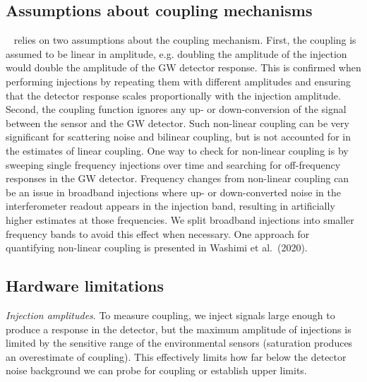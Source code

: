 \subsection{Assumptions about coupling mechanisms}

~ relies on two assumptions about the coupling mechanism.
First, the coupling is assumed to be linear in amplitude, e.g. doubling the amplitude of the injection would double the amplitude of the \ac{GW} detector response.
This is confirmed when performing injections by repeating them with different amplitudes and ensuring that the detector response scales proportionally with the injection amplitude.
Second, the coupling function ignores any up- or down-conversion of the signal between the sensor and the \ac{GW} detector.
Such non-linear coupling can be very significant for scattering noise and bilinear coupling, but is not accounted for in the estimates of linear coupling.
One way to check for non-linear coupling is by sweeping single frequency injections over time and searching for off-frequency responses in the \ac{GW} detector.
Frequency changes from non-linear coupling can be an issue in broadband injections where up- or down-converted noise in the interferometer readout appears in the injection band, resulting in artificially higher estimates at those frequencies.
We split broadband injections into smaller frequency bands to avoid this effect when necessary.
One approach for quantifying non-linear coupling is presented in Washimi et al.\ (2020).%

\subsection{Hardware limitations}\label{subsec:hardware_limitations}

\textit{Injection amplitudes}. To measure coupling, we inject signals large enough to produce a response in the detector, but the maximum amplitude of injections is limited by the sensitive range of the environmental sensors (saturation produces an overestimate of coupling).
This effectively limits how far below the detector noise background we can probe for coupling or establish upper limits.

